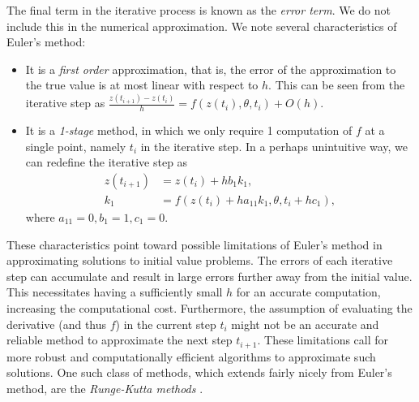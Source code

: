 \documentclass[a4paper,11pt,titlepage]{article}
\theoremstyle{definition}
\theoremstyle{plain}
\theoremstyle{remark}
\begin{document}
The final term in the iterative process is known as the \textit{error term}. We do not include this in the numerical approximation. We note several characteristics of Euler's method:
\begin{itemize}
    \item It is a \textit{first order} approximation, that is, the error of the approximation to the true value is at most linear with respect to $h$. This can be seen from the iterative step as $\frac{z(t_{i+1}) - z(t_i)}{h} = f(z(t_i),\theta,t_i) + O(h)$.
    \item It is a \textit{1-stage} method, in which we only require 1 computation of $f$ at a single point, namely $t_i$ in the iterative step. In a perhaps unintuitive way, we can redefine the iterative step as 
    \begin{align*}
        z(t_{i+1}) &= z(t_i) + h b_1 k_1, \\
        k_1 &= f\left(z(t_i) + h a_{11}k_1, \theta, t_i + hc_1\right),
    \end{align*}
    where $a_{11} = 0, b_1 = 1, c_1 = 0$.
\end{itemize}

These characteristics point toward possible limitations of Euler's method in approximating solutions to initial value problems. The errors of each iterative step can accumulate and result in large errors further away from the initial value. This necessitates having a sufficiently small $h$ for an accurate computation, increasing the computational cost. Furthermore, the assumption of evaluating the derivative (and thus $f$) in the current step $t_i$ might not be an accurate and reliable method to approximate the next step $t_{i+1}$. These limitations call for more robust and computationally efficient algorithms to approximate such solutions. One such class of methods, which extends fairly nicely from Euler's method, are the \textit{Runge-Kutta methods} \cite{sulimayers2003}.
\end{document}
